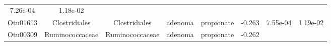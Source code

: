 \documentclass[11pt,]{article}
\begin{document}
\begin{longtable}[]{@{}cccccccc@{}}
\begin{minipage}[t]{0.08\columnwidth}
7.26e-04\strut
\end{minipage} & \begin{minipage}[t]{0.08\columnwidth}\centering\strut
1.18e-02\strut
\end{minipage}\tabularnewline
\begin{minipage}[t]{0.08\columnwidth}\centering\strut
Otu01613\strut
\end{minipage} & \begin{minipage}[t]{0.15\columnwidth}\centering\strut
Clostridiales\strut
\end{minipage} & \begin{minipage}[t]{0.15\columnwidth}\centering\strut
Clostridiales\strut
\end{minipage} & \begin{minipage}[t]{0.08\columnwidth}\centering\strut
adenoma\strut
\end{minipage} & \begin{minipage}[t]{0.09\columnwidth}\centering\strut
propionate\strut
\end{minipage} & \begin{minipage}[t]{0.07\columnwidth}\centering\strut
-0.263\strut
\end{minipage} & \begin{minipage}[t]{0.08\columnwidth}\centering\strut
7.55e-04\strut
\end{minipage} & \begin{minipage}[t]{0.08\columnwidth}\centering\strut
1.19e-02\strut
\end{minipage}\tabularnewline
\begin{minipage}[t]{0.08\columnwidth}\centering\strut
Otu00309\strut
\end{minipage} & \begin{minipage}[t]{0.15\columnwidth}\centering\strut
Ruminococcaceae\strut
\end{minipage} & \begin{minipage}[t]{0.15\columnwidth}\centering\strut
Ruminococcaceae\strut
\end{minipage} & \begin{minipage}[t]{0.08\columnwidth}\centering\strut
adenoma\strut
\end{minipage} & \begin{minipage}[t]{0.09\columnwidth}\centering\strut
propionate\strut
\end{minipage} & \begin{minipage}[t]{0.07\columnwidth}\centering\strut
-0.262\strut
\end{minipage} & \begin{minipage}[t]{0.08\columnwidth}\centering\strut

\end{minipage}
\end{longtable}
\end{document}
